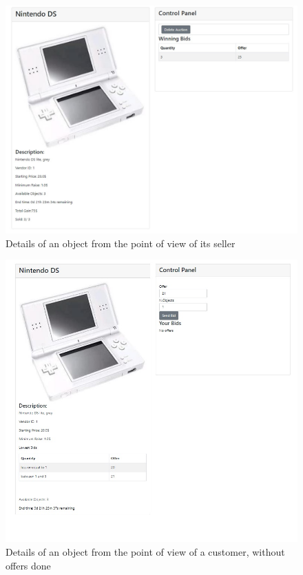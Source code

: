 \begin{figure}[htb]
	\centering
	\includegraphics[width=\textwidth]{img/detail_seller.jpg}
	\caption{Details of an object from the point of view of its
	seller}\label{fig:detail-seller}
\end{figure}

\begin{figure}[htb]
	\centering
	\includegraphics[width=\textwidth]{img/detail_customer.jpg}
	\caption{Details of an object from the point of view of a customer,
	without offers done}\label{fig:detail-customer}
\end{figure}

